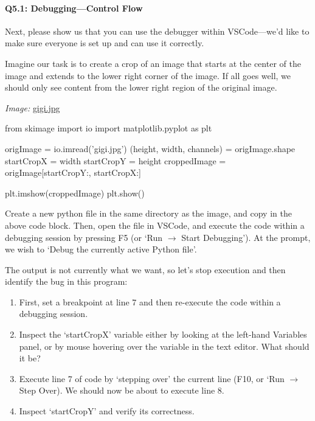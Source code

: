 \documentclass[11pt]{article}
\begin{document}

\pagebreak
\paragraph{Q5.1: Debugging---Control Flow} Next, please show us that you can use the debugger within VSCode---we'd like to make sure everyone is set up and can use it correctly. 

Imagine our task is to create a crop of an image that starts at the center of the image and extends to the lower right corner of the image. If all goes well, we should only see content from the lower right region of the original image.

\emph{Image:} \href{gigi.jpg}{gigi.jpg}

\begin{python}
from skimage import io
import matplotlib.pyplot as plt

origImage = io.imread('gigi.jpg')
(height, width, channels) = origImage.shape
startCropX = width %
startCropY = height %
croppedImage = origImage[startCropY:, startCropX:]

plt.imshow(croppedImage)
plt.show()
\end{python}

Create a new python file in the same directory as the image, and copy in the above code block. Then, open the file in VSCode, and execute the code within a debugging session by pressing F5 (or `Run $\rightarrow$ Start Debugging'). At the prompt, we wish to `Debug the currently active Python file'.

The output is not currently what we want, so let's stop execution and then identify the bug in this program:
\begin{enumerate}
    \item First, set a breakpoint at line 7 and then re-execute the code within a debugging session.
    \item Inspect the `startCropX' variable either by looking at the left-hand Variables panel, or by mouse hovering over the variable in the text editor. What should it be?
    \item Execute line 7 of code by `stepping over' the current line (F10, or `Run $\rightarrow$ Step Over). We should now be about to execute line 8.
    \item Inspect `startCropY' and verify its correctness.
\end{enumerate}
\end{document}
